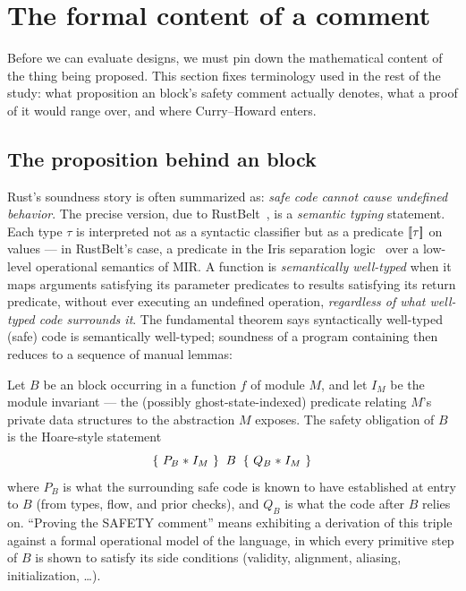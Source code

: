 \section{The formal content of a \safetyc{} comment}
\label{sec:theory}

Before we can evaluate designs, we must pin down the mathematical content of
the thing being proposed. This section fixes terminology used in the rest of
the study: what proposition an  block's safety comment actually
denotes, what a proof of it would range over, and where Curry--Howard enters.

\subsection{The proposition behind an  block}
\label{sec:theory-proposition}

Rust's soundness story is often summarized as: \emph{safe code cannot cause
undefined behavior}. The precise version, due to
RustBelt~\cite{rustbelt2018}, is a \emph{semantic typing} statement. Each
type $\tau$ is interpreted not as a syntactic classifier but as a predicate
$[\mkern-3.5mu[ \tau ]\mkern-3.5mu]$ on values --- in RustBelt's case, a predicate in the Iris
separation logic~\cite{iris2018} over a low-level operational semantics of
MIR. A function is \emph{semantically well-typed} when it maps arguments
satisfying its parameter predicates to results satisfying its return
predicate, without ever executing an undefined operation, \emph{regardless
of what well-typed code surrounds it}. The fundamental theorem says
syntactically well-typed (safe) code is semantically well-typed; soundness
of a program containing  then reduces to a sequence of manual
lemmas:

\begin{definition}
\label{def:obligation}
Let $B$ be an  block occurring in a function $f$ of module $M$,
and let $I_M$ be the module invariant --- the (possibly ghost-state-indexed)
predicate relating $M$'s private data structures to the abstraction $M$
exposes. The safety obligation of $B$ is the Hoare-style statement
\[
  \{\,\,P_B \mathrel{*} I_M\,\,\}\;\;B\;\;\{\,\,Q_B \mathrel{*} I_M\,\,\}
\]
where $P_B$ is what the surrounding safe code is known to have established
at entry to $B$ (from types, flow, and prior checks), and $Q_B$ is what the
code after $B$ relies on. ``Proving the SAFETY comment'' means exhibiting a
derivation of this triple against a formal operational model of the
language, in which every primitive step of $B$ is shown to satisfy its
side conditions (validity, alignment, aliasing, initialization, \dots).
\end{definition}

